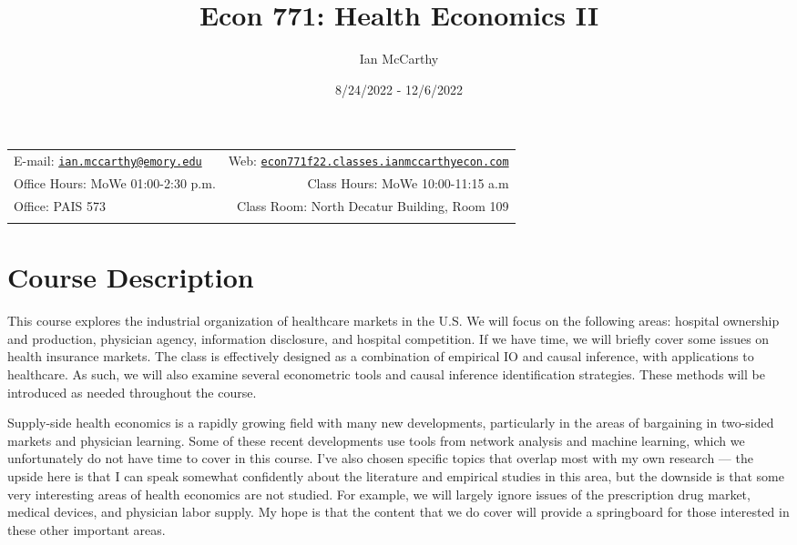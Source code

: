 \documentclass[11pt,]{article}
\title{Econ 771: Health Economics II}
\author{Ian McCarthy}
\date{8/24/2022 - 12/6/2022}
\begin{document}
  

		\maketitle
		
	
		\thispagestyle{firststyle}



	\noindent \begin{tabular*}{\textwidth}{ @{\extracolsep{\fill}} lr @{\extracolsep{\fill}}}


E-mail: \texttt{\href{mailto:ian.mccarthy@emory.edu}{\nolinkurl{ian.mccarthy@emory.edu}}} & Web: \href{http://econ771f22.classes.ianmccarthyecon.com}{\tt econ771f22.classes.ianmccarthyecon.com}\\
Office Hours: MoWe 01:00-2:30 p.m.  &  Class Hours: MoWe 10:00-11:15
a.m\\
Office: PAIS 573  & Class Room: North Decatur Building, Room 109\\
	&  \\
	\hline
	\end{tabular*}
	
\vspace{2mm}
	


\hypertarget{course-description}{%
\section{Course Description}\label{course-description}}

This course explores the industrial organization of healthcare markets
in the U.S. We will focus on the following areas: hospital ownership and
production, physician agency, information disclosure, and hospital
competition. If we have time, we will briefly cover some issues on
health insurance markets. The class is effectively designed as a
combination of empirical IO and causal inference, with applications to
healthcare. As such, we will also examine several econometric tools and
causal inference identification strategies. These methods will be
introduced as needed throughout the course.

Supply-side health economics is a rapidly growing field with many new
developments, particularly in the areas of bargaining in two-sided
markets and physician learning. Some of these recent developments use
tools from network analysis and machine learning, which we unfortunately
do not have time to cover in this course. I've also chosen specific
topics that overlap most with my own research --- the upside here is
that I can speak somewhat confidently about the literature and empirical
studies in this area, but the downside is that some very interesting
areas of health economics are not studied. For example, we will largely
ignore issues of the prescription drug market, medical devices, and
physician labor supply. My hope is that the content that we do cover
will provide a springboard for those interested in these other important
areas.
\end{document}

